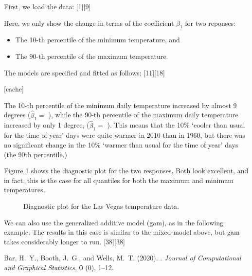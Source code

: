 \documentclass[a4paper,10pt]{article}
\begin{document}
First, we load the data:
[1][9]

Here, we only show the change in terms of the coefficient  $\beta_1$  for  two reponses:
\begin{itemize}
\item The 10-th percentile of the minimum temperature, and
\item The 90-th percentile of the maximum temperature.
\end{itemize}
The models are specified and fitted as follows:
[11][18]

[cache]

The 10-th percentile of the minimum daily temperature  increased by almost 9 degrees ($\hat\beta_1=$ ), while  the 90-th percentile of the maximum daily temperature increased by only 1 degree, ($\hat\beta_1=$ ).
This means that the 10\% `cooler than usual for the time of year' days were quite warmer in 2010 than in 1960, but there was no significant change in the 10\% `warmer than usual for the time of year' days (the 90th percentile.)

Figure \ref{temps} shows the diagnostic plot for the two responses. Both look excellent, and in fact, this is the case for all quantiles for both the maximum and minimum temperatures.

\begin{figure}[t!]
\centering
{}
\caption{Diagnostic plot for the Las Vegas temperature data.}\label{temps}
\end{figure}

We can also use the generalized additive model (gam), as in the following example. The results in this case is similar to the mixed-model above, but gam takes considerably longer to run.
[38][38]





\begin{thebibliography}{99}
{\rm Bar, H.~Y., Booth, J.~G., {\rm and} Wells, M.~T.} (2020).
.
\newblock \emph{Journal of Computational and Graphical Statistics}, {\bf  0} (0),  1--12.
\end{thebibliography}
\end{document}
